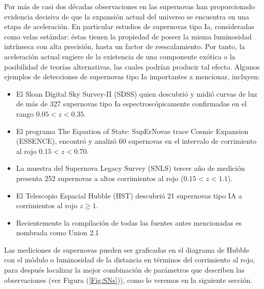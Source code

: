 \documentclass[10.5pt,prb,
               showpacs,            %
               preprintnumbers,     %
               aps,                 %
               prl,          	    %
               letterpaper,             %
               superscriptaddress,      %
               nofootinbib,         %
               tightenlines,        %
               floats,floatfix      %
               ,usenatbib]{revtex4-1}%
\begin{document}
Por m\'as de casi dos d\'ecadas observaciones en las supernovas han proporcionado 
evidencia decisiva de que la expansi\'on actual del universo se encuentra en una etapa de 
aceleraci\'on. En particular estudios de supernovas tipo Ia, consideradas como velas est\'andar:
\'estas tienen la propiedad de poseer la misma luminosidad intr\'inseca con alta precisi\'on, hasta un factor 
de reescalamiento. Por tanto, la aceleraci\'on actual sugiere de la existencia de una componente ex\'otica
o la posibilidad de teor\'ias alternativas, las cuales podr\'ian producir tal efecto. Algunos ejemplos 
de detecciones de supernovas tipo Ia importantes a mencionar, incluyen:

	\begin{itemize}
		\item El Sloan Digital Sky Survey-II (SDSS) quien descubri\'o y midi\'o curvas de luz de m\'as de 327 supernovas
			tipo Ia espectrosc\'opicamente confirmadas en el rango $0.05 < z < 0.35$.
		\item El programa The Equation of State: SupErNovae trace Cosmic Expansion (ESSENCE),
			encontr\'o y analiz\'o 60 supernovas en el intervalo de corrimiento al rojo $0.15 < z < 0.70$.
		\item La muestra del Supernova Legacy Survey (SNLS) tercer a\~no de medici\'on presenta 252 supernovas a altos
			corrimientos al rojo ($0.15 < z < 1.1$).
		\item El Telescopio Espacial Hubble (HST) descubri\'o 21 supernovas tipo IA a corrimientos al rojo $z\geq 1$.
		\item Recientemente la compilaci\'on de todas las fuentes antes mencionadas es nombrada
			como Union 2.1
	\end{itemize}

Las mediciones de supernovas pueden ser graficadas en el diagrama de Hubble con el m\'odulo o luminosidad de la distancia 
en t\'erminos del corrimiento al rojo, para despu\'es localizar la mejor combinaci\'on de par\'ametros que describen las observaciones
(ver Figura (\ref{Fig:SNs})), como lo veremos en la siguiente secci\'on.
\end{document}
